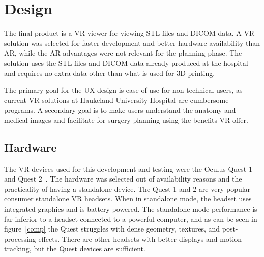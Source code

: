 \documentclass[a4paper]{report}
\begin{document}
\section{Design}


The final product is a VR viewer for viewing STL files and DICOM data. A VR solution was selected for faster development and better hardware availability than AR, while the AR advantages were not relevant for the planning phase.
The solution uses the STL files and DICOM data already produced at the hospital and requires no extra data other than what is used for 3D printing.

The primary goal for the UX design is ease of use for non-technical users, as current VR solutions at Haukeland University Hospital are cumbersome programs.
A secondary goal is to make users understand the anatomy and medical images and facilitate for surgery planning using the benefits VR offer.

\subsection{Hardware}
The VR devices used for this development and testing were the Oculus Quest 1 and Quest 2~\cite{noauthor_oculus_nodate}. The hardware was selected out of availability reasons and the practicality of having a standalone device.
The Quest 1 and 2 are very popular consumer standalone VR headsets. When in standalone mode, the headset uses integrated graphics and is battery-powered. The standalone mode performance is far inferior to a headset connected to a powerful computer, and as can be seen in figure~\ref{comp} the Quest struggles with dense geometry, textures, and post-processing effects.
There are other headsets with better displays and motion tracking, but the Quest devices are sufficient.
\end{document}
